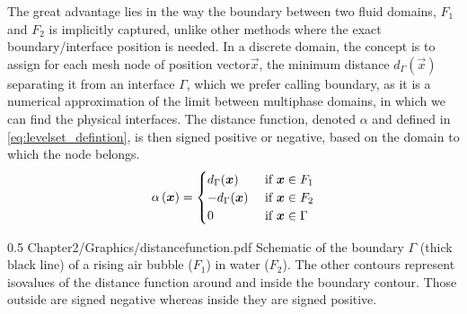 The great advantage lies in the way the boundary between two fluid domains, $F_1$ and $F_2$ is implicitly captured, unlike 
other methods where the exact boundary/interface position is needed. In a discrete domain, the concept is to assign for each 
mesh node of position vector$\vec{x}$, the minimum distance $d_\Gamma(\vec{x})$ separating it from an interface $\Gamma$,
which we prefer calling boundary, as it is a numerical approximation of the limit between multiphase domains, in which we can find the physical interfaces.
The distance function, denoted $\alpha$ and defined in \cref{eq:levelset_defintion}, is then signed positive or negative, based on the domain 
to which the node belongs.
\begin{align}
\label{eq:levelset_defintion}
\levelsetx = 
\begin{cases}
  d_\Gamma(\vec{x}) 		& \text{ if } \vec{x} \in F_1 \\ 
 -d_\Gamma(\vec{x})			& \text{ if } \vec{x} \in F_2 \\ 
  0 						& \text{ if } \vec{x} \in \Gamma %
\end{cases}
\end{align}
\begin{figureth}
{0.5}
{Chapter2/Graphics/distancefunction.pdf}
{Schematic of the boundary $\Gamma$ (thick black line) of a rising air bubble ($F_1$) in water ($F_2$). 
The other contours represent isovalues of the distance function around and inside the boundary contour. 
Those outside are signed negative whereas inside they are signed positive.}
\label{fig:distance_function}
\end{figureth}
